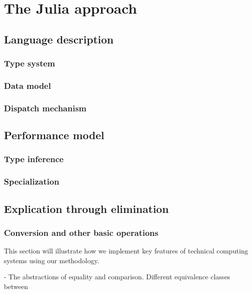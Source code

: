 \chapter{The Julia approach}

\section{Language description}

\subsection{Type system}

\subsection{Data model}

\subsection{Dispatch mechanism}

\section{Performance model}

\subsection{Type inference}

\subsection{Specialization}

\section{Explication through elimination}

\subsection{Conversion and other basic operations}

This section will illustrate how we implement key features of technical computing
systems using our methodology.

- The abstractions of equality and comparison. Different equivalence classes between

